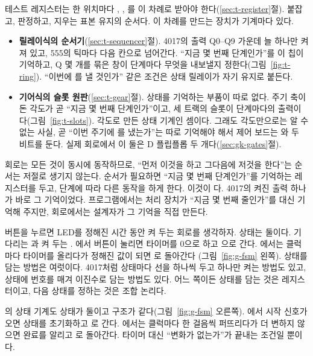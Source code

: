 \Relay 테스트 레지스터는 한 위치마다 , , 를 이 차례로 받아야
한다(\ref{sec:t-register}절). 붙잡고, 판정하고, 지우는 표본 유지의 순서다. 이 차례를 만드는 장치가 기계마다
있다.
\begin{itemize}
\item \textbf{릴레이식의 순서기}(\ref{sec:t-sequencer}절). 4017의 출력 Q0--Q9 가운데 늘 하나만 켜져 있고,
555의 틱마다 다음 칸으로 넘어간다. ``지금 몇 번째 단계인가''를 이 칩이 기억하고, Q 몇 개를 묶은 창이 단계마다
무엇을 내보낼지 정한다(그림~\ref{fig:t-ring}). ``이번에 를 낼 것인가'' 같은 조건은 상태 릴레이가 자기
유지로 붙든다.
\item \textbf{기어식의 슬롯 원판}(\ref{sec:t-gear}절). 상태를 기억하는 부품이 따로 없다. 주기 축이 돈 각도가
곧 ``지금 몇 번째 단계인가''이고, 세 트랙의 슬롯이 단계마다의 출력이다(그림~\ref{fig:t-slots}). 각도로 만든
상태 기계인 셈이다. 그래도 각도만으로는 알 수 없는 사실, 곧 ``이번 주기에 를 냈는가''는 따로
기억해야 해서 제어 보드는 와  두 비트를 둔다. 실제 회로에서 이 둘은 D 플립플롭
두 개다(\ref{sec:gk-gates}절).
\end{itemize}

\Why 회로는 모든 것이 동시에 동작하므로, ``먼저 이것을 하고 그다음에 저것을 한다''는 순서는 저절로
생기지 않는다. 순서가 필요하면 ``지금 몇 번째 단계인가''를 기억하는 레지스터를 두고, 단계에 따라 다른
동작을 하게 한다. 이것이 다. 4017의 켜진 출력 하나가 바로 그
기억이었다. 프로그램에서는 처리 장치가 ``지금 몇 번째 줄인가''를 대신 기억해 주지만, 회로에서는 설계자가 그
기억을 직접 만든다.

\General 버튼을 누르면 LED를 정해진 시간 동안 켜 두는 회로를 생각하자. 상태는 둘이다. 기다리는
과 켜 두는 . 에서 버튼이 눌리면 타이머를 0으로 하고 으로 간다.
에서는 클럭마다 타이머를 올리다가 정해진 값이 되면 로 돌아간다
(그림~\ref{fig:g-fsm} 왼쪽). 상태를 담는 방법은 여럿이다. 4017처럼 상태마다 선을 하나씩 두고 하나만 켜는
방법도 있고, 상태에 번호를 매겨 이진수로 담는 방법도 있다. 어느 쪽이든 상태를 담는 것은 레지스터이고, 다음
상태를 정하는 것은 조합 논리다.

\Ours {}의 상태 기계도 상태가 둘이고 구조가 같다(그림~\ref{fig:g-fsm} 오른쪽).
에서 시작 신호가 오면 상태를 초기화하고 로 간다. 에서는 클럭마다 한
걸음씩 퍼뜨리다가 더 변하지 않으면 완료를 알리고 로 돌아간다. 타이머 대신 ``변화가 없는가''가
끝내는 조건일 뿐이다.

